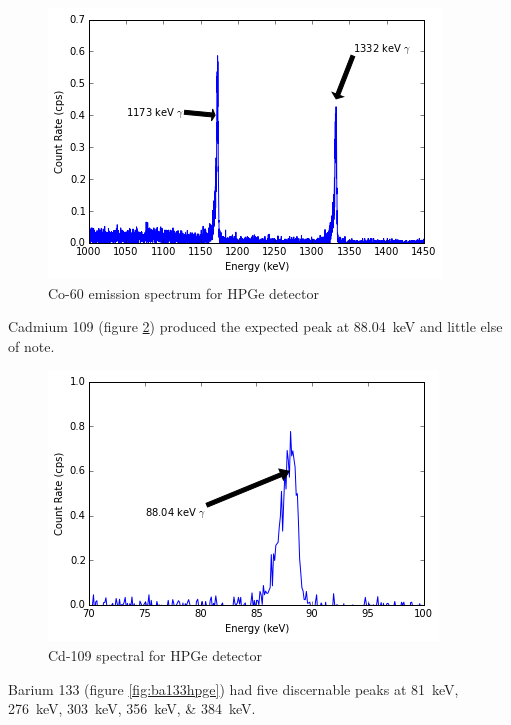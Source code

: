 \documentclass[12pt]{article}
\begin{document}
\begin{center}
\begin{figure}
	\includegraphics{hpge_co60}
	\caption{Co-60 emission spectrum for HPGe detector}
	\label{fig:co60hpge}
\end{figure}
\end{center}

Cadmium 109 (figure \ref{fig:cd109hpge}) produced the expected peak at \SI{88.04}{\kilo\electronvolt} and little else of note.

\begin{center}
\begin{figure}
	\includegraphics{hpge_cd109}
	\caption{Cd-109 spectral for HPGe detector}
	\label{fig:cd109hpge}
\end{figure}
\end{center}

Barium 133 (figure \ref{fig:ba133hpge}) had five discernable peaks at \SIlist{81;276;303;356;384}{\kilo\electronvolt}.
\end{document}
